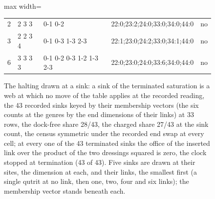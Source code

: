 \begin{figure}[htbp]
{\begin{adjustbox}{max width=\linewidth}
\begin{tabular}{lllll}
2 & 2 3 3 & 0-1 0-2 & 22:0;23:2;24:0;33:0;34:0;44:0 & no \\
3 & 2 2 3 4 & 0-1 0-3 1-3 2-3 & 22:1;23:0;24:2;33:0;34:1;44:0 & no \\
6 & 3 3 3 3 & 0-1 0-2 0-3 1-2 1-3 2-3 & 22:0;23:0;24:0;33:6;34:0;44:0 & no \\
\end{tabular}\end{adjustbox}}
\caption{The halting drawn at a sink: a sink of the terminated saturation is a web at which no move of the table applies at the recorded reading, the 43 recorded sinks keyed by their membership vectors (the six counts at the genres by the end dimensions of their links) at 33 rows, the dock-free share 28/43, the charged share 27/43 at the sink count, the census symmetric under the recorded end swap at every cell; at every one of the 43 terminated sinks the office of the inserted link over the product of the two dressings squared is zero, the clock stopped at termination (43 of 43). Five sinks are drawn at their sites, the dimension at each, and their links, the smallest first (a single qutrit at no link, then one, two, four and six links); the membership vector stands beneath each.}\label{fig:I-5-D543318-halting-sink}
\end{figure}

